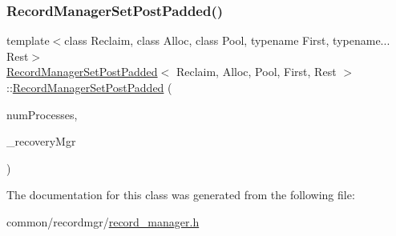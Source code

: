 \subsubsection{\texorpdfstring{Record\+Manager\+Set\+Post\+Padded()}{RecordManagerSetPostPadded()}}
{\footnotesize\ttfamily template$<$class Reclaim, class Alloc, class Pool, typename First, typename... Rest$>$ \\
\hyperlink{classRecordManagerSetPostPadded}{Record\+Manager\+Set\+Post\+Padded}$<$ Reclaim, Alloc, Pool, First, Rest $>$\+::\hyperlink{classRecordManagerSetPostPadded}{Record\+Manager\+Set\+Post\+Padded} (\begin{DoxyParamCaption}\item[{const int}]{num\+Processes,  }\item[{\hyperlink{classRecoveryMgr}{Recovery\+Mgr}$<$ void $\ast$$>$ $\ast$const}]{\+\_\+recovery\+Mgr }\end{DoxyParamCaption})\hspace{0.3cm}{\ttfamily [inline]}}



The documentation for this class was generated from the following file\+:\begin{DoxyCompactItemize}
\item 
common/recordmgr/\hyperlink{record__manager_8h}{record\+\_\+manager.\+h}\end{DoxyCompactItemize}
